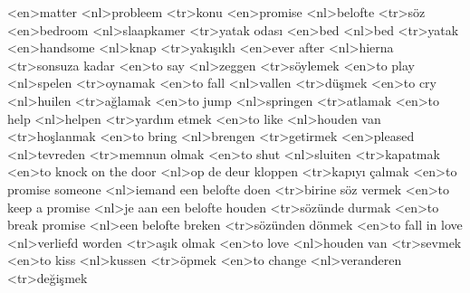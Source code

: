 <en>matter
<nl>probleem
<tr>konu
<en>promise
<nl>belofte
<tr>söz
<en>bedroom
<nl>slaapkamer
<tr>yatak odası
<en>bed
<nl>bed
<tr>yatak
<en>handsome
<nl>knap
<tr>yakışıklı
<en>ever after
<nl>hierna
<tr>sonsuza kadar
<en>to say
<nl>zeggen
<tr>söylemek
<en>to play
<nl>spelen
<tr>oynamak
<en>to fall
<nl>vallen
<tr>düşmek
<en>to cry
<nl>huilen
<tr>ağlamak
<en>to jump
<nl>springen
<tr>atlamak
<en>to help
<nl>helpen
<tr>yardım etmek
<en>to like
<nl>houden van
<tr>hoşlanmak
<en>to bring
<nl>brengen
<tr>getirmek
<en>pleased
<nl>tevreden
<tr>memnun olmak
<en>to shut
<nl>sluiten
<tr>kapatmak
<en>to knock on the door
<nl>op de deur kloppen
<tr>kapıyı çalmak
<en>to promise someone
<nl>iemand een belofte doen
<tr>birine söz vermek
<en>to keep a promise
<nl>je aan een belofte houden
<tr>sözünde durmak
<en>to break promise
<nl>een belofte breken
<tr>sözünden dönmek
<en>to fall in love
<nl>verliefd worden
<tr>aşık olmak
<en>to love
<nl>houden van
<tr>sevmek
<en>to kiss
<nl>kussen
<tr>öpmek
<en>to change
<nl>veranderen
<tr>değişmek
